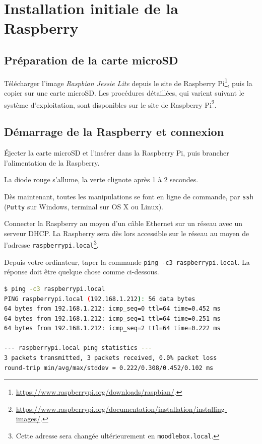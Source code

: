 \documentclass[11pt]{article}
\begin{document}
\section{Installation initiale de la Raspberry}

\subsection{Préparation de la carte microSD}

Télécharger l'image \emph{Raspbian Jessie Lite} depuis le site de Raspberry Pi\footnote{\url{https://www.raspberrypi.org/downloads/raspbian/}.}, puis la copier sur une carte microSD. Les procédures détaillées, qui varient suivant le système d'exploitation, sont disponibles sur le site de Raspberry Pi\footnote{\url{https://www.raspberrypi.org/documentation/installation/installing-images/}.}.

\subsection{Démarrage de la Raspberry et connexion}

Éjecter la carte microSD et l'insérer dans la Raspberry Pi, puis brancher l'alimentation de la Raspberry.

\begin{verification}
La diode rouge s'allume, la verte clignote après 1 à 2 secondes.
\end{verification}


Dès maintenant, toutes les manipulations se font en ligne de commande, par \lstinline{ssh} (\lstinline{Putty} sur Windows, terminal sur OS X ou Linux).

Connecter la Raspberry au moyen d'un câble Ethernet sur un réseau avec un serveur DHCP. La Raspberry sera dès lors accessible sur le réseau au moyen de l'adresse \lstinline{raspberrypi.local}\footnote{Cette adresse sera changée ultérieurement en \lstinline{moodlebox.local}.}.

\begin{verification}
Depuis votre ordinateur, taper la commande \lstinline{ping -c3 raspberrypi.local}. La réponse doit être quelque chose comme ci-dessous.

\begin{lstlisting}[language=bash]
$ ping -c3 raspberrypi.local
PING raspberrypi.local (192.168.1.212): 56 data bytes
64 bytes from 192.168.1.212: icmp_seq=0 ttl=64 time=0.452 ms
64 bytes from 192.168.1.212: icmp_seq=1 ttl=64 time=0.251 ms
64 bytes from 192.168.1.212: icmp_seq=2 ttl=64 time=0.222 ms

--- raspberrypi.local ping statistics ---
3 packets transmitted, 3 packets received, 0.0% packet loss
round-trip min/avg/max/stddev = 0.222/0.308/0.452/0.102 ms
\end{lstlisting}
\end{verification}
\end{document}
